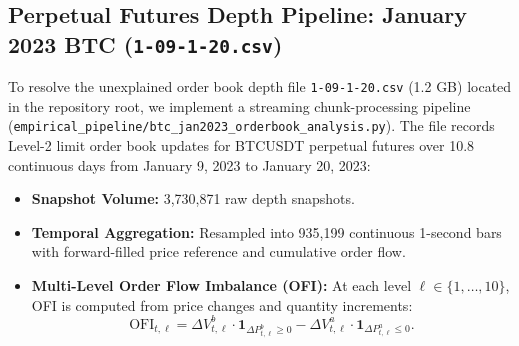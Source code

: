 \documentclass[11pt,a4paper]{article}
\theoremstyle{definition}\newtheorem{definition}[theorem]{Definition}
\theoremstyle{remark}\newtheorem{remark}[theorem]{Remark}
\begin{document}
\subsection{Perpetual Futures Depth Pipeline: January 2023 BTC (\nolinkurl{1-09-1-20.csv})}
\label{sec:supp_btc_jan2023}
To resolve the unexplained order book depth file \nolinkurl{1-09-1-20.csv} (1.2 GB) located in the repository root, we implement a streaming chunk-processing pipeline (\nolinkurl{empirical_pipeline/btc_jan2023_orderbook_analysis.py}). The file records Level-2 limit order book updates for BTCUSDT perpetual futures over 10.8 continuous days from January 9, 2023 to January 20, 2023:
\begin{itemize}
    \item \textbf{Snapshot Volume:} 3,730,871 raw depth snapshots.
    \item \textbf{Temporal Aggregation:} Resampled into 935,199 continuous 1-second bars with forward-filled price reference and cumulative order flow.
    \item \textbf{Multi-Level Order Flow Imbalance (OFI):} At each level $\ell \in \{1, \ldots, 10\}$, OFI is computed from price changes and quantity increments:
    \begin{equation}
    \text{OFI}_{t,\ell} = \Delta V_{t,\ell}^b \cdot \mathbf{1}_{\Delta P_{t,\ell}^b \ge 0} - \Delta V_{t,\ell}^a \cdot \mathbf{1}_{\Delta P_{t,\ell}^a \le 0}.
    \end{equation}
\end{itemize}
\end{document}
